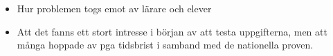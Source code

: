 \begin{itemize}
\item Hur problemen togs emot av lärare och elever
\item Att det fanns ett stort intresse i början av att testa uppgifterna, men att många hoppade av pga tidsbrist i samband med de nationella proven.
\end{itemize}
